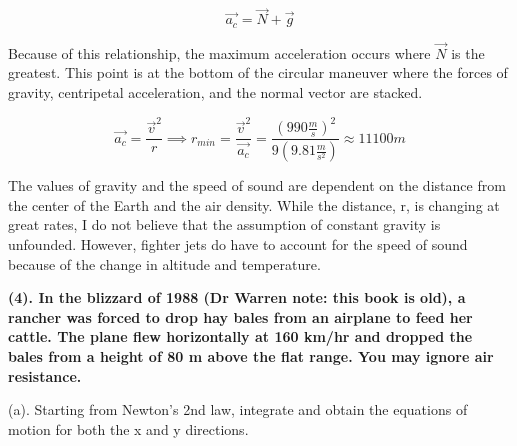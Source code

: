 \documentclass[12pt]{article}
\begin{document}

$$
\vec{a_c} = \vec{N} + \vec{g}
$$

Because of this relationship, the maximum acceleration occurs where $\vec{N}$ is the greatest. This point is at the bottom of the circular maneuver where the forces of gravity, centripetal acceleration, and the normal vector are stacked.

$$
\vec{a_c} = \frac{\vec{v}^2}{r} \implies r_{min} = \frac{\vec{v}^2}{\vec{a_c}} = \frac{(990 \frac{m}{s})^2}{9(9.81 \frac{m}{s^2})} \approx 11100 m
$$

The values of gravity and the speed of sound are dependent on the distance from the center of the Earth and the air density. While the distance, r, is changing at great rates, I do not believe that the assumption of constant gravity is unfounded. However, fighter jets do have to account for the speed of sound because of the change in altitude and temperature.





\newpage
\textbf{
(4). In the blizzard of 1988 (Dr Warren note: this book is old), a rancher
was forced to drop hay bales from an airplane to feed her cattle. The plane flew horizontally at
160 km/hr and dropped the bales from a height of 80 m above the flat range. You may ignore
air resistance.
}

\hfill \break

(a). Starting from Newton’s 2nd law, integrate and obtain the equations of motion for
both the x and y directions.
 
\end{document}

